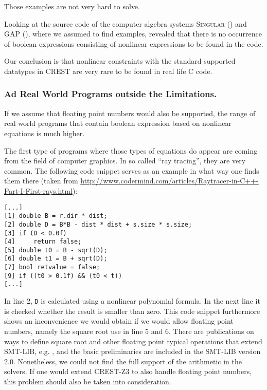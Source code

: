 \documentclass[oribibl]{llncs}
\begin{document}
Those examples are not very hard to solve.

Looking at the source code of the computer algebra systems \textsc{Singular} (\cite{Singular:2012})
and \textsc{GAP} (\cite{GAP4}), where we assumed to find examples,
revealed that there is no occurrence of boolean expressions consisting
of nonlinear expressions to be
found in the code.

Our conclusion is that nonlinear constraints with the standard
supported datatypes in \textsc{CREST} are very rare to be found in
real life \textsc{C} code.

\subsubsection{Ad Real World Programs outside the Limitations.}

If we assume that floating point numbers would also be supported, the
range of real world programs that contain boolean expression based on
nonlinear equations is much higher.

The first type of programs where those types of equations do appear
are coming from the field of computer graphics. In so called ``ray
tracing'', they are very common. The following code snippet serves as an example in what way one finds them there (taken from \url{http://www.codermind.com/articles/Raytracer-in-C++-Part-I-First-rays.html}):
\begin{verbatim}
[...]
[1] double B = r.dir * dist;
[2] double D = B*B - dist * dist + s.size * s.size; 
[3] if (D < 0.0f) 
[4]     return false; 
[5] double t0 = B - sqrt(D); 
[6] double t1 = B + sqrt(D);
[7] bool retvalue = false;  
[9] if ((t0 > 0.1f) && (t0 < t)) 
[...]
\end{verbatim}

In line 2, \texttt{D} is calculated using a nonlinear polynomial
formula. In the next line it is checked whether the result is smaller
than zero.
This code snippet furthermore shows an inconvenience we would obtain
if we would allow floating point numbers, namely the square root use
in line 5 and 6. There are publications on ways to define square root and other
floating point typical operations that extend \textsc{SMT-LIB},
e.g. \cite{rummer2010smt}, and the basic preliminaries are included in
the \textsc{SMT-LIB} version 2.0. Nonetheless, we could not find the
full support of the arithmetic in the solvers. If one would extend
\textsc{CREST-Z3} to also handle floating point numbers, this problem
should also be taken into consideration.
\end{document}
